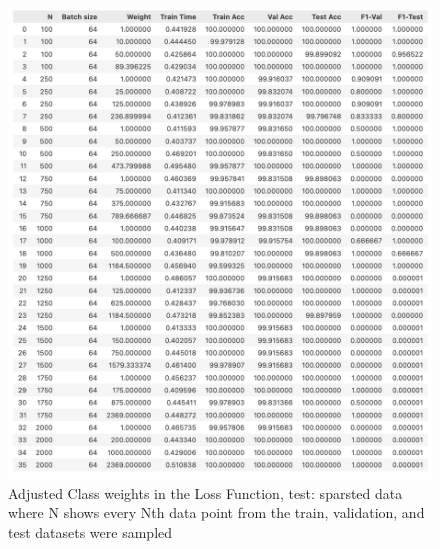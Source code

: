 \begin{solve}
\begin{enumerate}
    \begin{figure}[H]
        \includegraphics[scale=.72]{plots/2_weight_sparsed.png}
        \caption{Adjusted Class weights in the  Loss Function, test: sparsted data where N shows every Nth data point from the train, validation, and test datasets were sampled}
        \label{weight_mod_on_sparsed_test}
    \end{figure}


\end{enumerate}
\end{solve}

